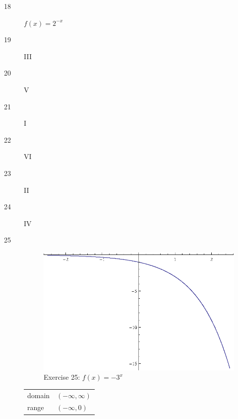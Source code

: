 \documentclass{exam}
\begin{document}
\begin{description}
    \item[18] $f(x) = 2^{-x}$

    \item[19] III

    \item[20] V

    \item[21] I

    \item[22] VI

    \item[23] II

    \item[24] IV

    \item[25] 
      \begin{figure}[H]
        \centering
        \includegraphics[scale=1.0]{exercise25.eps}
        \caption*{Exercise 25: $f(x) = -3^x$}
      \end{figure}

      \begin{tabular}[H]{ll}
        \toprule
        domain & $(-\infty, \infty)$ \\
        range  & $(-\infty, 0)$ \\
        \bottomrule
      \end{tabular}

    \pagebreak


\end{description}
\end{document}
